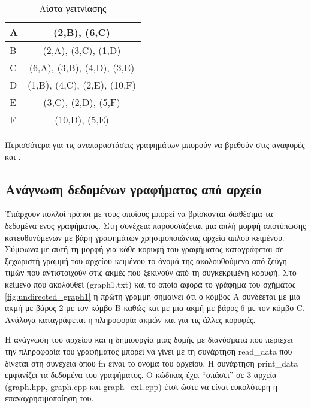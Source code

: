 \begin{table}[ht]
	\centering
	\begin{tabular}{|
		>{\columncolor[HTML]{C0C0C0}}l |c|}
		\hline
		A & (2,B), (6,C)                \\ \hline
		B & (2,A), (3,C), (1,D)         \\ \hline
		C & (6,A), (3,B), (4,D), (3,E)  \\ \hline
		D & (1,B), (4,C), (2,E), (10,F) \\ \hline
		E & (3,C), (2,D), (5,F)         \\ \hline
		F & (10,D), (5,E)               \\ \hline
	\end{tabular}
	\caption{Λίστα γειτνίασης}
	\label{tbl:adjacency_list}
\end{table}

Περισσότερα για τις αναπαραστάσεις γραφημάτων μπορούν να βρεθούν στις αναφορές \cite{g4g_graph_representations} και \cite{he_graph_representations}.

\subsection{Ανάγνωση δεδομένων γραφήματος από αρχείο}
Υπάρχουν πολλοί τρόποι με τους οποίους μπορεί να βρίσκονται διαθέσιμα τα δεδομένα ενός γραφήματος. Στη συνέχεια παρουσιάζεται μια απλή μορφή αποτύπωσης κατευθυνόμενων με βάρη γραφημάτων χρησιμοποιώντας αρχεία απλού κειμένου. Σύμφωνα με αυτή τη μορφή για κάθε κορυφή του γραφήματος καταγράφεται σε ξεχωριστή γραμμή του αρχείου κειμένου το όνομά της ακολουθούμενο από ζεύγη τιμών που αντιστοιχούν στις ακμές που ξεκινούν από τη συγκεκριμένη κορυφή. Στο κείμενο που ακολουθεί (graph1.txt) και το οποίο αφορά το γράφημα του σχήματος \ref{fig:undirected_graph1} η πρώτη γραμμή σημαίνει ότι ο κόμβος Α συνδέεται με μια ακμή με βάρος 2 με τον κόμβο B καθώς και με μια ακμή με βάρος 6 με τον κόμβο C. Ανάλογα καταγράφεται η πληροφορία ακμών και για τις άλλες κορυφές.



Η ανάγνωση του αρχείου και η δημιουργία μιας δομής με διανύσματα που περιέχει την πληροφορία του γραφήματος μπορεί να γίνει με τη συνάρτηση read\_data που δίνεται στη συνέχεια όπου fn είναι το όνομα του αρχείου. Η συνάρτηση print\_data εμφανίζει τα δεδομένα του γραφήματος. Ο κώδικας έχει ``σπάσει'' σε 3 αρχεία (graph.hpp, graph.cpp και graph\_ex1.cpp) έτσι ώστε να είναι ευκολότερη η επαναχρησιμοποίηση του.

